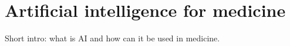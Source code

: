 \section{Artificial intelligence for medicine}

Short intro: what is AI and how can it be used in medicine.